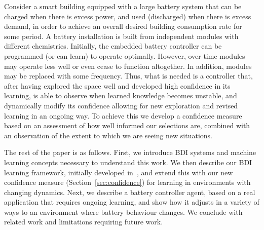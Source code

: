 Consider a smart building equipped with a large
battery system that can be charged when there is excess power, and
used (discharged) when there is excess demand, in order to
achieve an overall desired building consumption rate for some
period. A battery installation is built from independent modules with
different chemistries. Initially, the embedded battery controller can
be programmed (or can learn) to operate optimally. However, over time
modules may operate less well or even
cease to function altogether. In addition, modules may be replaced
with some frequency.   
Thus, what is needed is a controller that, after having explored
the space well and developed high confidence in its learning,
is able to observe when learned knowledge becomes unstable, and
dynamically modify its confidence allowing for new exploration and
revised learning in an ongoing way. To achieve this we develop a
confidence measure based on an assessment of how well informed our
selections are, combined with an observation of the extent to which we
are seeing new situations.

The rest of the paper is as follows.
%
First, we introduce BDI systems and machine learning
concepts necessary to understand this work.  
%
We then describe our BDI learning framework, initially developed
in~\cite{airiau09:enhancing,singh10:extending,singh10:learning}, and
extend this with our new confidence measure (Section~\ref{sec:confidence})
for learning in environments with changing dynamics.  
%
Next, we describe a battery controller agent, based on a real
application that requires ongoing learning, and show how it adjusts in
a variety of ways to an environment where battery behaviour changes.  
%
We conclude with related work and limitations requiring future work.




